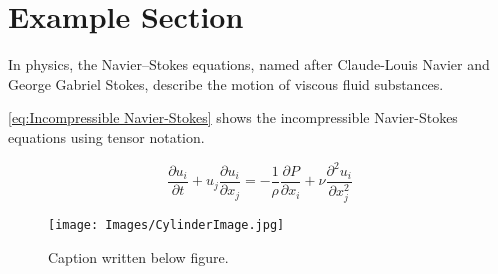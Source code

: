 \section{Example Section}

In physics, the Navier–Stokes equations, named after Claude-Louis Navier and George Gabriel Stokes, describe the motion of viscous fluid substances.

\eqref{eq:Incompressible Navier-Stokes} shows the incompressible Navier-Stokes equations using tensor notation.

\begin{equation}
    \frac{\partial u_i}{\partial t} + u_j \frac{\partial u_i}{\partial x_j} = -\frac{1}{\rho} \frac{\partial P}{\partial x_i} + \nu \frac{\partial^2 u_i}{\partial x_j^2}
    \label{eq:Incompressible Navier-Stokes}
\end{equation}



\begin{figure}[H]
    \centering
    \texttt{[image: Images/CylinderImage.jpg]}
    \caption[Caption used in list of tables]{Caption written below figure.}
    \label{fig:flow around cylinder}
\end{figure}

